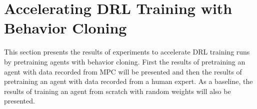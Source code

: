\section{Accelerating DRL Training with Behavior Cloning}
This section presents the results of experiments to accelerate DRL training runs by pretraining agents with behavior cloning. First the results of pretraining an agent with data recorded from MPC will be presented and then the results of pretraining an agent with data recorded from a human expert. As a baseline, the results of training an agent from scratch with random weights will also be presented. 
